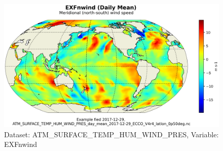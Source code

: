\begin{figure}[H]
\centering
\includegraphics[scale=0.55]{../images/plots/latlon_plots/Atmosphere_Surface_Temperature_Humidity_Wind_and_Pressure/EXFnwind.png}
\caption{Dataset: ATM\_SURFACE\_TEMP\_HUM\_WIND\_PRES, Variable: EXFnwind}
\label{tab:table-ATM_SURFACE_TEMP_HUM_WIND_PRES_EXFnwind-Plot}
\end{figure}
\pagebreak
